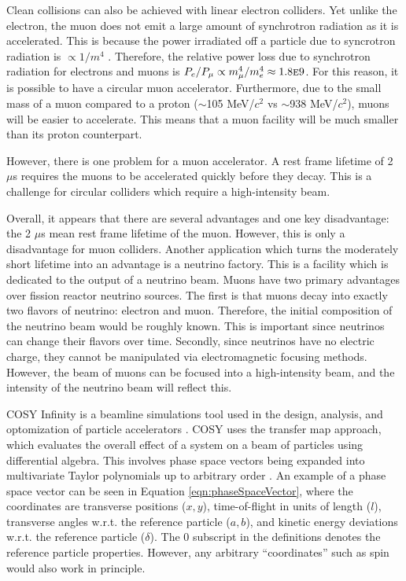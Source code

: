Clean collisions can also be achieved with linear electron colliders. Yet unlike the electron, the muon does not emit a large amount of synchrotron radiation as it is accelerated. This is because the power irradiated off a particle due to syncrotron radiation is $\propto 1/m^4$ \cite{griffithsem}. Therefore, the relative power loss due to synchrotron radiation for electrons and muons is $P_e/P_\mu\propto m_\mu ^4/m_e ^4 \approx 1.8 \text{\sc{e}}9$. For this reason, it is possible to have a circular muon accelerator. Furthermore, due to the small mass of a muon compared to a proton ($\sim$105 MeV/$c^2$ vs $\sim$938 MeV/$c^2$), muons will be easier to accelerate. This means that a muon facility will be much smaller than its proton counterpart. 

However, there is one problem for a muon accelerator. A rest frame lifetime of 2 $\mu$s requires the muons to be accelerated quickly before they decay. This is a challenge for circular colliders which require a high-intensity beam.

Overall, it appears that there are several advantages and one key disadvantage: the 2 $\mu$s mean rest frame lifetime of the muon. However, this is only a disadvantage for muon colliders. Another application which turns the moderately short lifetime into an advantage is a neutrino factory. This is a facility which is dedicated to the output of a neutrino beam. Muons have two primary advantages over fission reactor neutrino sources. The first is that muons decay into exactly two flavors of neutrino: electron and muon. Therefore, the initial composition of the neutrino beam would be roughly known. This is important since neutrinos can change their flavors over time. Secondly, since neutrinos have no electric charge, they cannot be manipulated via electromagnetic focusing methods. However, the beam of muons can be focused into a high-intensity beam, and the intensity of the neutrino beam will reflect this.

\par
COSY Infinity is a beamline simulations tool used in the design, analysis, and optomization of particle accelerators \cite{cosy}. COSY uses the transfer map approach, which evaluates the overall effect of a system on a beam of particles using differential algebra. This involves phase space vectors being expanded into multivariate Taylor polynomials up to arbitrary order \cite{modernMapMethods}. An example of a phase space vector can be seen in Equation \ref{eqn:phaseSpaceVector}, where the coordinates are transverse positions ($x, y$), time-of-flight in units of length ($l$), transverse angles w.r.t. the reference particle ($a, b$), and kinetic energy deviations w.r.t. the reference particle ($\delta$). The $0$ subscript in the definitions denotes the reference particle properties. However, any arbitrary ``coordinates'' such as spin would also work in principle.


